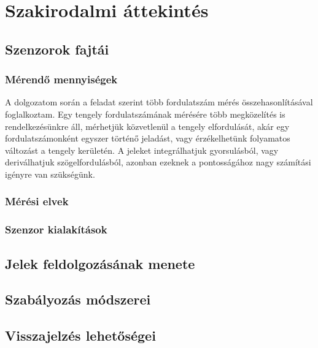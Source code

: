 \chapter{Szakirodalmi áttekintés}
\label{sec:Szakirodalom}
\section{Szenzorok fajtái}

\subsection{Mérendő mennyiségek}

A dolgozatom során a feladat szerint több fordulatszám mérés összehasonlításával foglalkoztam. 
Egy tengely fordulatszámának mérésére több megközelítés is rendelkezésünkre áll, mérhetjük közvetlenül a tengely elfordulását, akár egy fordulatszámonként egyszer történő jeladást, vagy érzékelhetünk folyamatos változást a tengely kerületén. A jeleket integrálhatjuk gyorsulásból, vagy deriválhatjuk szögelfordulásból, azonban ezeknek a pontosságához nagy számítási igényre van szükségünk.

\subsection{Mérési elvek}

\subsection{Szenzor kialakítások}
\section{Jelek feldolgozásának menete}

\section{Szabályozás módszerei}

\section{Visszajelzés lehetőségei}

